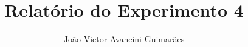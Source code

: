 \title{Relat\' orio do Experimento 4}

\newcommand{\disciplina}{Laborat\' orio de Eletricidade Aplicada}

\author{Jo\~ ao Victor Avancini Guimar\~ aes}

\newcommand{\matricula}{12/0122405}

\newcommand{\professor}{Rudi Van Els}

\date{}
